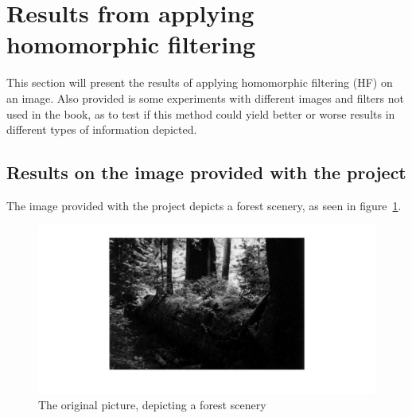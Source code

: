 % 


\section{Results from applying homomorphic filtering}
	This section will present the results of applying homomorphic filtering (HF)
	on an image. Also provided is some experiments with different images
	and filters not used in the book, as to test if this method could yield
	better or worse results in different types of information depicted.
	\subsection{Results on the image provided with the project}
		The image provided with the project depicts a forest scenery, %
		as seen in figure~\ref{fig:original}.
		\begin{figure}[h!]
			\includegraphics[width=\textwidth]{pics/orig_pic.png}
			\caption{The original picture, depicting a forest scenery}
			\label{fig:original}		
		\end{figure}		
		
		
